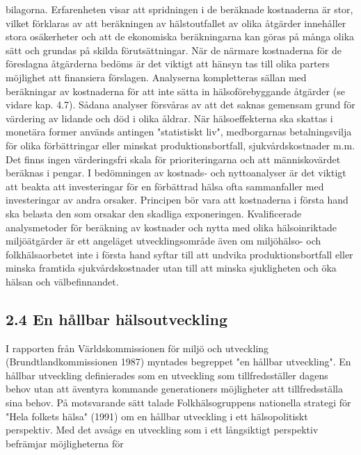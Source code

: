 bilagorna. Erfarenheten visar att spridningen i de beräknade kostnaderna är stor, vilket förklaras av att beräkningen av hälstoutfallet av olika åtgärder innehåller stora osäkerheter och att de ekonomiska beräkningarna kan göras på många olika sätt och grundas på skilda förutsättningar. När de närmare kostnaderna för de föreslagna åtgärderna bedöms är det viktigt att hänsyn tas till olika parters möjlighet att finansiera förslagen.
Analyserna kompletteras sällan med beräkningar av kostnaderna för att inte sätta in hälsoförebyggande åtgärder (se vidare kap. 4.7). Sådana analyser försvåras av att det saknas gemensam grund för värdering av lidande och död i olika åldrar. När hälsoeffekterna ska skattas i monetära former används antingen "statistiskt liv", medborgarnas betalningsvilja för olika förbättringar eller minskat produktionsbortfall, sjukvårdskostnader m.m. Det finns ingen värderingsfri skala för prioriteringarna och att människovärdet beräknas i pengar.
I bedömningen av kostnads- och nyttoanalyser är det viktigt att beakta att investeringar för en förbättrad hälsa ofta sammanfaller med investeringar av andra orsaker. Principen bör vara att kostnaderna i första hand ska belasta den som orsakar den skadliga exponeringen.
Kvalificerade analysmetoder för beräkning av kostnader och nytta med olika hälsoinriktade miljöätgärder är ett angeläget utvecklingsområde även om miljöhälso- och folkhälsaorbetet inte i första hand syftar till att undvika produktionsbortfall eller minska framtida sjukvårdskostnader utan till att minska sjukligheten och öka hälsan och välbefinnandet.
\subsection*{2.4 En hållbar hälsoutveckling}
I rapporten från Världskommissionen för miljö och utveckling (Brundtlandkommissionen 1987) myntades begreppet "en hållbar utveckling". En hållbar utveckling definierades som en utveckling som tillfredsställer dagens behov utan att äventyra kommande generationers möjligheter att tillfredsställa sina behov. På motsvarande sätt talade Folkhälsogruppens nationella strategi för "Hela folkets hälsa" (1991) om en hållbar utveckling i ett hälsopolitiskt perspektiv. Med det avsågs en utveckling som i ett långsiktigt perspektiv befrämjar möjligheterna för

